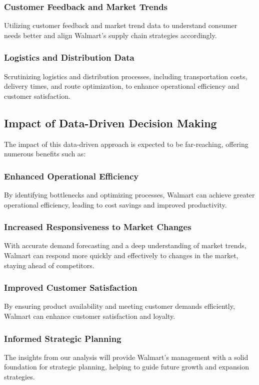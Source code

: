 \documentclass[conference]{IEEEtran}
\begin{document}
\subsubsection{Customer Feedback and Market Trends}
Utilizing customer feedback and market trend data to understand consumer needs better and align Walmart's supply chain strategies accordingly.

\subsubsection{Logistics and Distribution Data}
Scrutinizing logistics and distribution processes, including transportation costs, delivery times, and route optimization, to enhance operational efficiency and customer satisfaction.

\subsection{Impact of Data-Driven Decision Making}
The impact of this data-driven approach is expected to be far-reaching, offering numerous benefits such as:

\subsubsection{Enhanced Operational Efficiency}
By identifying bottlenecks and optimizing processes, Walmart can achieve greater operational efficiency, leading to cost savings and improved productivity.

\subsubsection{Increased Responsiveness to Market Changes}
With accurate demand forecasting and a deep understanding of market trends, Walmart can respond more quickly and effectively to changes in the market, staying ahead of competitors.

\subsubsection{Improved Customer Satisfaction}
By ensuring product availability and meeting customer demands efficiently, Walmart can enhance customer satisfaction and loyalty.

\subsubsection{Informed Strategic Planning}
The insights from our analysis will provide Walmart's management with a solid foundation for strategic planning, helping to guide future growth and expansion strategies.
\end{document}
